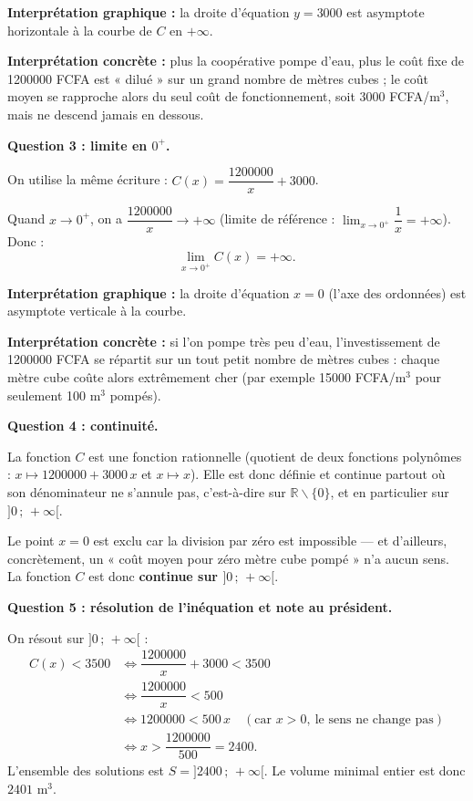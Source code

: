 \documentclass[11pt]{article}
\newcommand{\cle}[1]{{\popxbold\color{popdark}#1}}
\def\setminus{\mathbin{\backslash}}\let\smallsetminus\setminus
\begin{document}
\begin{exoresolu}
\textbf{Interprétation graphique :} la droite d'équation $y = \num{3000}$ est \cle{asymptote horizontale} à la courbe de $C$ en $+\infty$.

\textbf{Interprétation concrète :} plus la coopérative pompe d'eau, plus le coût fixe de \num{1200000} FCFA est « dilué » sur un grand nombre de mètres cubes ; le coût moyen se rapproche alors du seul coût de fonctionnement, soit \num{3000} FCFA/m$^3$, mais ne descend jamais en dessous.

\textbf{Question 3 : limite en $0^+$.}

On utilise la même écriture : $C(x) = \dfrac{\num{1200000}}{x} + \num{3000}$.

Quand $x \to 0^+$, on a $\dfrac{\num{1200000}}{x} \to +\infty$ (limite de référence : $\displaystyle\lim_{x \to 0^+} \dfrac{1}{x} = +\infty$). Donc :
\[ \lim_{x \to 0^+} C(x) = +\infty. \]

\textbf{Interprétation graphique :} la droite d'équation $x = 0$ (l'axe des ordonnées) est \cle{asymptote verticale} à la courbe.

\textbf{Interprétation concrète :} si l'on pompe très peu d'eau, l'investissement de \num{1200000} FCFA se répartit sur un tout petit nombre de mètres cubes : chaque mètre cube coûte alors extrêmement cher (par exemple \num{15000} FCFA/m$^3$ pour seulement 100 m$^3$ pompés).

\textbf{Question 4 : continuité.}

La fonction $C$ est une \cle{fonction rationnelle} (quotient de deux fonctions polynômes : $x \mapsto \num{1200000} + \num{3000}\,x$ et $x \mapsto x$). Elle est donc définie et continue partout où son dénominateur ne s'annule pas, c'est-à-dire sur $\mathbb{R} \setminus \{0\}$, et en particulier sur $]0\,;\,+\infty[$.

Le point $x = 0$ est exclu car la division par zéro est impossible — et d'ailleurs, concrètement, un « coût moyen pour zéro mètre cube pompé » n'a aucun sens. La fonction $C$ est donc \textbf{continue sur $]0\,;\,+\infty[$}.

\textbf{Question 5 : résolution de l'inéquation et note au président.}

On résout sur $]0\,;\,+\infty[$ :
\begin{align*}
C(x) < \num{3500} &\iff \dfrac{\num{1200000}}{x} + \num{3000} < \num{3500} \\
&\iff \dfrac{\num{1200000}}{x} < 500 \\
&\iff \num{1200000} < 500\,x \quad (\text{car } x > 0,\ \text{le sens ne change pas}) \\
&\iff x > \dfrac{\num{1200000}}{500} = \num{2400}.
\end{align*}
L'ensemble des solutions est $S = ]\num{2400}\,;\,+\infty[$. Le volume minimal entier est donc $\num{2401}$ m$^3$.


\end{exoresolu}
\end{document}
